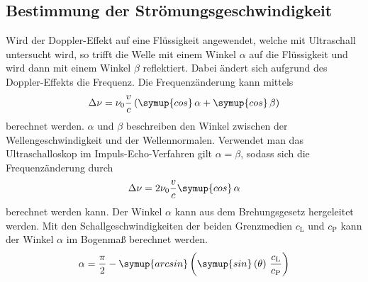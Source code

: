 \subsection{Bestimmung der Strömungsgeschwindigkeit}
\label{subsec:strömung}
Wird der Doppler-Effekt auf eine Flüssigkeit angewendet, welche mit Ultraschall untersucht wird, so trifft die Welle mit einem Winkel $\alpha$ auf die Flüssigkeit
und wird dann mit einem Winkel $\beta$ reflektiert. Dabei ändert sich aufgrund des Doppler-Effekts die Frequenz. Die Frequenzänderung kann mittels
\begin{equation*}
    \Delta\nu = \nu_0\frac{v}{c}\left(\symup{cos}\,\alpha + \symup{cos}\,\beta\right)
\end{equation*}
berechnet werden. $\alpha$ und $\beta$ beschreiben den Winkel zwischen der Wellengeschwindigkeit und der Wellennormalen. Verwendet man das Ultraschalloskop 
im Impuls-Echo-Verfahren gilt $\alpha = \beta$, sodass sich die Frequenzänderung durch 
\begin{equation}
    \label{eqn:frequenzverschiebung}
    \Delta\nu = 2\nu_0\frac{v}{c}\symup{cos}\,\alpha
\end{equation}
berechnet werden kann. Der Winkel $\alpha$ kann aus dem Brehungsgesetz hergeleitet werden. Mit den Schallgeschwindigkeiten der beiden Grenzmedien $c_\text{L}$ und $c_\text{P}$
kann der Winkel $\alpha$ im Bogenmaß berechnet werden. 
\begin{equation}
    \label{eqn:alpha}
    \alpha = \frac{\pi}{2} - \symup{arcsin}\left(\symup{sin}\left(\theta\right)\,\frac{c_\text{L}}{c_\text{P}}\right)
\end{equation}
